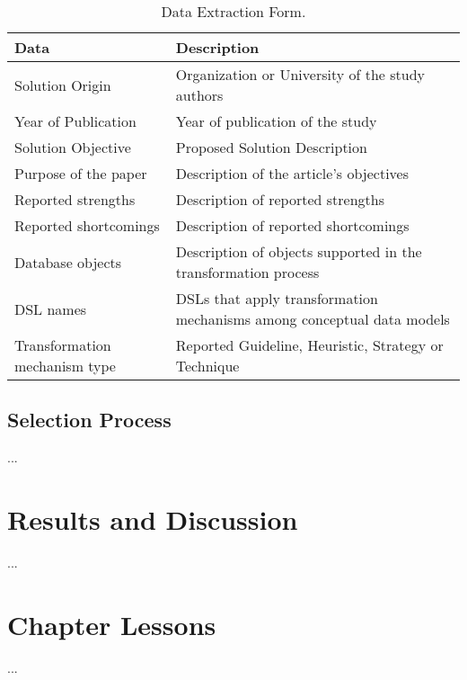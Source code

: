 \begin{table}[!htb]
    \centering
    \scriptsize
    \caption{Data Extraction Form.}
    \label{tab:DataExtractionForm}
    \begin{tabular}{p{5cm}|p{10cm}}
    \bottomrule
    \rowcolor[HTML]{C0C0C0} 
    \textbf{Data} & \textbf{Description} \\
    \hline
    Solution Origin & Organization or University of the study authors
    \\
    Year of Publication & Year of publication of the study
    \\
    Solution Objective & Proposed Solution Description
    \\
    Purpose of the paper & Description of the article's objectives
    \\
    Reported strengths & Description of reported strengths
    \\
    Reported shortcomings & Description of reported shortcomings
    \\
    Database objects & Description of objects supported in the transformation process
    \\
    DSL names & DSLs that apply transformation mechanisms among conceptual data models
    \\
    Transformation mechanism type & Reported Guideline, Heuristic, Strategy or Technique
    \\
    \toprule
    \end{tabular}
\end{table}

\subsection{Selection Process} \label{ssec_slm:selectionProcess}

...

\section{Results and Discussion} \label{sec_slm:resultsDiscussion}
...
\section{Chapter Lessons} \label{sec_slm:lessons}
...
